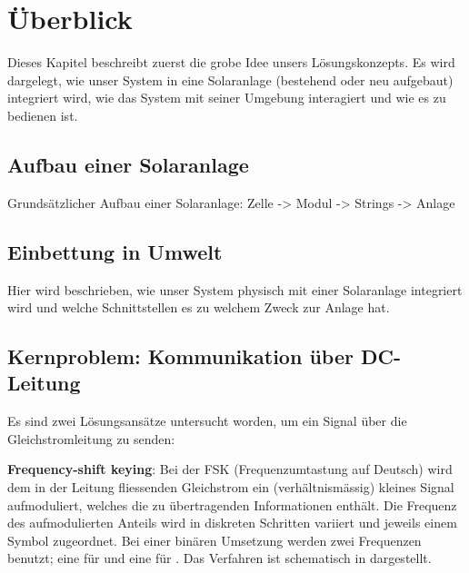 \chapter{\"Uberblick}
\label{chap:uberblick}
Dieses Kapitel  beschreibt zuerst die grobe  Idee unsers L\"osungskonzepts. Es
wird  dargelegt, wie  unser System  in  eine Solaranlage  (bestehend oder  neu
aufgebaut) integriert wird, wie das System mit seiner Umgebung interagiert und
wie es zu bedienen ist.


\section{Aufbau einer Solaranlage}
\label{sec:solaranlage:aufbau}

Grunds\"atzlicher Aufbau einer Solaranlage: Zelle -> Modul -> Strings -> Anlage


\section{Einbettung in Umwelt}
\label{sec:einbettung}

Hier  wird  beschrieben,  wie  unser System  physisch  mit  einer  Solaranlage
integriert wird und welche Schnittstellen es zu welchem Zweck zur Anlage hat.


\section{Kernproblem: Kommunikation \"uber DC-Leitung}
\label{sec:commDCLine}

Es sind  zwei L\"osungsans\"atze untersucht  worden, um ein Signal  \"uber die
Gleichstromleitung zu senden:

\textbf{Frequency-shift keying}: Bei  der FSK (Frequenzumtastung  auf Deutsch)
wird  dem in  der Leitung  fliessenden Gleichstrom  ein (verh\"altnism\"assig)
kleines  Signal aufmoduliert,  welches  die  zu \"ubertragenden  Informationen
enth\"alt. Die  Frequenz   des  aufmodulierten   Anteils  wird   in  diskreten
Schritten variiert  und jeweils  einem Symbol zugeordnet. Bei  einer bin\"aren
Umsetzung  werden  zwei  Frequenzen  benutzt; eine  f\"ur    und  eine
f\"ur  .   Das  Verfahren ist  schematisch  in  
dargestellt.

